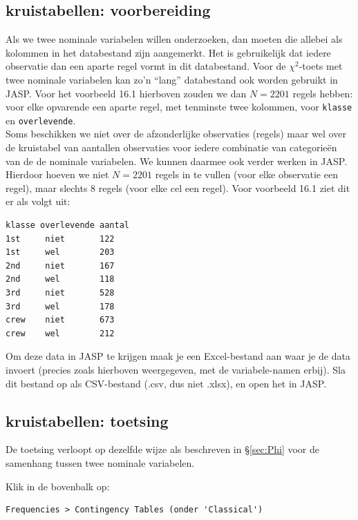 \documentclass[
]{book}
\begin{document}
\hypertarget{kruistabellen-voorbereiding-1}{%
\subsection{kruistabellen: voorbereiding}\label{kruistabellen-voorbereiding-1}}

Als we twee nominale variabelen willen onderzoeken, dan moeten die allebei als kolommen in het databestand zijn aangemerkt.
Het is gebruikelijk dat iedere observatie dan een aparte regel vormt in dit databestand. Voor de \(\chi^2\)-toets met twee nominale variabelen kan zo'n ``lang'' databestand ook worden gebruikt in JASP. Voor het voorbeeld 16.1 hierboven zouden we dan \(N=2201\) regels hebben: voor elke opvarende een aparte regel, met tenminste twee kolommen, voor \texttt{klasse} en \texttt{overlevende}.\\

Soms beschikken we niet over de afzonderlijke observaties (regels) maar
wel over de kruistabel van aantallen observaties voor iedere combinatie
van categorieën van de de nominale variabelen. We kunnen daarmee ook
verder werken in JASP. Hierdoor hoeven we niet \(N=2201\) regels in te vullen (voor elke observatie een regel), maar slechts 8 regels (voor elke cel een regel).
Voor voorbeeld 16.1 ziet dit er als volgt uit:

\begin{verbatim}
klasse overlevende aantal
1st     niet       122
1st     wel        203
2nd     niet       167
2nd     wel        118
3rd     niet       528
3rd     wel        178
crew    niet       673
crew    wel        212
\end{verbatim}

Om deze data in JASP te krijgen maak je een Excel-bestand aan waar je de data invoert (precies zoals hierboven weergegeven, met de variabele-namen erbij).
Sla dit bestand op als CSV-bestand (.csv, dus niet .xlsx), en open het in JASP.

\hypertarget{kruistabellen-toetsing-1}{%
\subsection{kruistabellen: toetsing}\label{kruistabellen-toetsing-1}}

De toetsing verloopt op dezelfde wijze als beschreven in
§\ref{sec:Phi} voor de samenhang tussen twee nominale variabelen.

Klik in de bovenbalk op:

\begin{verbatim}
Frequencies > Contingency Tables (onder 'Classical')
\end{verbatim}
\end{document}
